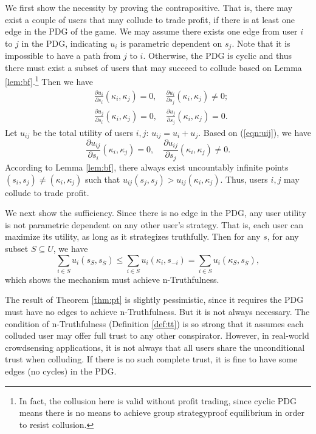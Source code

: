 \documentclass[conference]{IEEEtran}
\theoremstyle{definition}
\begin{document}
\begin{IEEEproof}
We first show the necessity by proving the contrapositive. That is, there may exist a couple of users that may collude to trade profit, if there is at least one edge in the PDG of the game. We may assume there exists one edge from user $i$ to $j$ in the PDG, indicating $u_i$ is parametric dependent on $s_j$. Note that it is impossible to have a path from $j$ to $i$. Otherwise, the PDG is cyclic and thus there must exist a subset of users that may succeed to collude based on Lemma \ref{lem:bf}.\footnote{In fact, the collusion here is valid without profit trading, since cyclic PDG means there is no means to achieve group strategyproof equilibrium in order to resist collusion.} Then we have
\begin{equation}
\label{eqn:uij}
\begin{aligned}
&\frac{\partial u_i}{\partial s_i}(\kappa_i,\kappa_j)=0, \quad \frac{\partial u_i}{\partial s_j}(\kappa_i,\kappa_j)\not=0;\\
&\frac{\partial u_j}{\partial s_i}(\kappa_i,\kappa_j)=0, \quad \frac{\partial u_j}{\partial s_j}(\kappa_i,\kappa_j)=0.
\end{aligned}
\end{equation}
Let $u_{ij}$ be the total utility of users $i,j$: $u_{ij}=u_i+u_j$. Based on (\ref{eqn:uij}), we have
\begin{equation}
\frac{\partial u_{ij}}{\partial s_i}(\kappa_i,\kappa_j)=0, \quad \frac{\partial u_{ij}}{\partial s_j}(\kappa_i,\kappa_j)\not=0.
\end{equation}
According to Lemma \ref{lem:bf}, there always exist uncountably infinite points $(s_i,s_j)\not=(\kappa_i,\kappa_j)$ such that $u_{ij}(s_j,s_j)>u_{ij}(\kappa_i,\kappa_j)$. Thus, users $i,j$ may collude to trade profit.

We next show the sufficiency. Since there is no edge in the PDG, any user utility is not parametric dependent on any other user\rq{}s strategy. That is, each user can maximize its utility, as long as it strategizes truthfully. Then for any $s$, for any subset $S\subseteq U$, we have
\begin{equation}
\sum_{i\in S}u_i(s_S,s_{\overline{S}})\leq \sum_{i\in S}u_i(\kappa_i,s_{-i}) = \sum_{i\in S}u_i(\kappa_S,s_{\overline{S}}),
\end{equation}
which shows the mechanism must achieve n-Truthfulness.
\end{IEEEproof}
{\color{black}
The result of Theorem \ref{thm:pt} is slightly pessimistic, since it requires the PDG must have no edges to achieve n-Truthfulness. But it is not always necessary. The condition of n-Truthfulness (Definition \ref{def:tt}) is so strong that it assumes each colluded user may offer full trust to any other conspirator. However, in real-world crowdsensing applications, it is not always that all users share the unconditional trust when colluding. If there is no such complete trust, it is fine to have some edges (no cycles) in the PDG.
}
\end{document}
